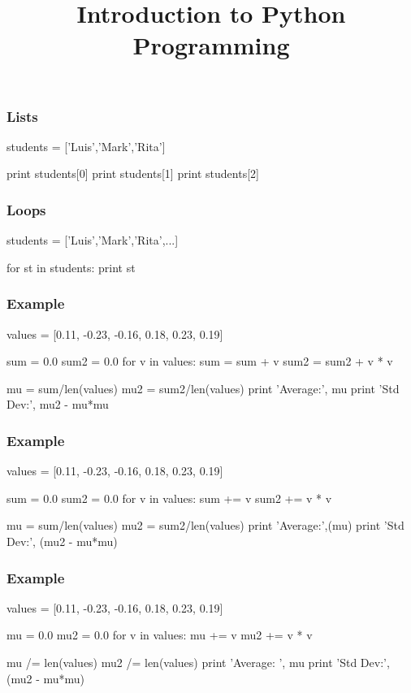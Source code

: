 
\title[Python I]{Introduction to Python Programming}


\frame{\maketitle}

\begin{frame}[fragile]
\frametitle{Lists}

\begin{python}

students = ['Luis','Mark','Rita']

print students[0]
print students[1]
print students[2]
\end{python}

\end{frame}

\begin{frame}[fragile]
\frametitle{Loops}

\begin{python}
students = ['Luis','Mark','Rita',...]

for st in students:
    print st
\end{python}
\end{frame}

\begin{frame}[fragile]
\frametitle{Example}

\begin{python}
values = [0.11, -0.23, -0.16, 0.18, 0.23, 0.19]

sum = 0.0
sum2 = 0.0
for v in values:
    sum = sum + v
    sum2 = sum2 + v * v

mu = sum/len(values)
mu2 = sum2/len(values)
print 'Average:', mu
print 'Std Dev:', mu2 - mu*mu
\end{python}
\end{frame}

\begin{frame}[fragile]
\frametitle{Example}

\begin{python}
values = [0.11, -0.23, -0.16, 0.18, 0.23, 0.19]

sum = 0.0
sum2 = 0.0
for v in values:
    sum += v
    sum2 += v * v

mu = sum/len(values)
mu2 = sum2/len(values)
print 'Average:',(mu)
print 'Std Dev:', (mu2 - mu*mu)
\end{python}
\end{frame}

\begin{frame}[fragile]
\frametitle{Example}

\begin{python}
values = [0.11, -0.23, -0.16, 0.18, 0.23, 0.19]

mu = 0.0
mu2 = 0.0
for v in values:
    mu += v
    mu2 += v * v

mu /= len(values)
mu2 /= len(values)
print 'Average: ', mu
print 'Std Dev:', (mu2 - mu*mu)
\end{python}
\end{frame}

